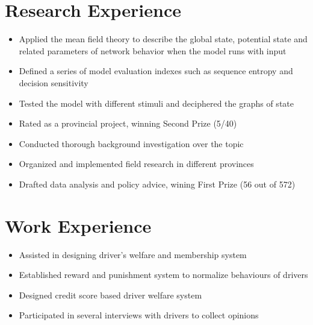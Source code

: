 \documentclass{resume}
\begin{document}
\section{Research Experience}
\begin{itemize}
  \item Applied the mean field theory to describe the global state, potential state and related parameters of network behavior when the model runs with input
  \item Defined a series of model evaluation indexes such as sequence entropy and decision sensitivity
  \item Tested the model with different stimuli and deciphered the graphs of state 
  \item Rated as a provincial project, winning Second Prize (5/40)
\end{itemize}
\begin{itemize}
  \item Conducted thorough background investigation over the topic
  \item Organized and implemented field research in different provinces
  \item Drafted data analysis and policy advice, wining First Prize (56 out of 572) 
\end{itemize}

\section{Work Experience}
\begin{itemize}
  \item Assisted in designing driver's welfare and membership system
  \item Established reward and punishment system to normalize behaviours of drivers
  \item Designed credit score based driver welfare system 
  \item Participated in several interviews with drivers to collect opinions 
\end{itemize}
\end{document}
